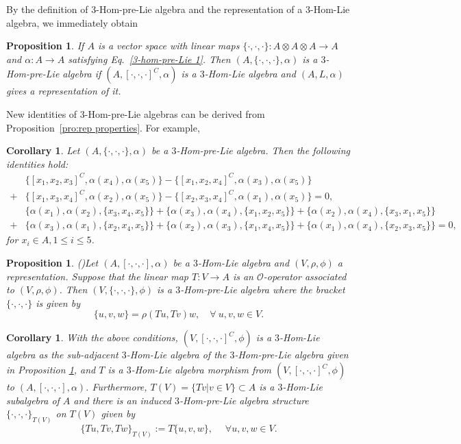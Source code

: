 \documentclass[a4paper,11pt]{article}
\newtheorem{cor}[thm]{Corollary}
\newtheorem{pro}[thm]{Proposition}
\theoremstyle{definition}
\begin{document}
By the definition of  $3$-Hom-pre-Lie algebra and  the representation of a $3$-Hom-Lie algebra, we immediately obtain
\begin{pro}
If $A$ is  a vector space with linear maps
$\{\cdot,\cdot,\cdot\}:A\otimes A\otimes A\rightarrow A$ and $\alpha:A\rightarrow A$
satisfying
 Eq.~\eqref{3-hom-pre-Lie 1}. Then $(A,\{\cdot,\cdot,\cdot\},\alpha) $ is a $3$-Hom-pre-Lie algebra if $(A,[\cdot,\cdot,\cdot]^C,\alpha)$ is a $3$-Hom-Lie algebra and $(A,L,\alpha)$ gives a representation of it.
\end{pro}

New identities of 3-Hom-pre-Lie algebras can be derived from Proposition~\ref{pro:rep properties}. For example,

\begin{cor}
Let $(A,\{\cdot,\cdot,\cdot\},\alpha)$ be a $3$-Hom-pre-Lie algebra. Then the following identities hold:
{\small\begin{align}
&\nonumber\{ [x_1,x_2,x_3]^C,\alpha(x_4), \alpha(x_5)\}-\{[x_1,x_2,x_4]^C,\alpha(x_3), \alpha(x_5) \}\\
+&\{[x_1,x_3,x_4]^C,\alpha(x_2),\alpha( x_5)\}
-\{[x_2,x_3,x_4]^C,\alpha(x_1), \alpha(x_5)\}=0,\\
&\{\alpha(x_1),\alpha(x_2),\{x_3,x_4, x_5\}\}+\{\alpha(x_3),\alpha(x_4),\{x_1,x_2, x_5\}\}+\{\alpha(x_2),\alpha(x_4),\{x_3,x_1, x_5\}\}\nonumber\\
+&\{\alpha(x_3),\alpha(x_1),\{x_2,x_4, x_5\}\}+\{\alpha(x_2),\alpha(x_3),\{x_1,x_4, x_5\}\}+\{\alpha(x_1),\alpha(x_4),\{x_2,x_3, x_5\}\}=0,
\end{align}}
for $x_i\in A, 1\leq i\leq 5$.
\end{cor}


\begin{pro}(\cite{Guo&Zhang&Wang})\label{pro:3hompreLieT}
Let $(A,[\cdot,\cdot,\cdot],\alpha)$ be a $3$-Hom-Lie algebra and $(V,\rho,\phi)$ a representation. Suppose that the linear map $T:V\rightarrow A$ is an $\mathcal O$-operator associated
to $(V,\rho,\phi)$. Then $(V,\{\cdot,\cdot,\cdot\},\phi)$ is a $3$-Hom-pre-Lie algebra where the bracket $\{\cdot,\cdot,\cdot\}$ is given by
\begin{equation}
\{u,v,w\}=\rho(Tu,Tv)w,\quad\forall ~ u,v,w\in V.
\end{equation}
\end{pro}

\begin{cor}
With the above conditions,  $(V,[\cdot,\cdot,\cdot]^C,\phi)$ is a $3$-Hom-Lie
algebra as the sub-adjacent $3$-Hom-Lie algebra of the $3$-Hom-pre-Lie
algebra given in Proposition \ref{pro:3hompreLieT}, and $T$ is a $3$-Hom-Lie algebra morphism from $(V,[\cdot,\cdot,\cdot]^C,\phi)$ to $(A,[\cdot,\cdot,\cdot],\alpha)$. Furthermore,
$T(V)=\{Tv|v\in V\}\subset A$ is a $3$-Hom-Lie subalgebra of $A$ and there is an induced $3$-Hom-pre-Lie algebra structure $\{\cdot,\cdot,\cdot\}_{T(V)}$ on
$T(V)$ given by
\begin{equation}
\{Tu,Tv,Tw\}_{T(V)}:=T\{u,v,w\},\quad\;\forall u,v,w\in V.
\end{equation}
\end{cor}
\end{document}
